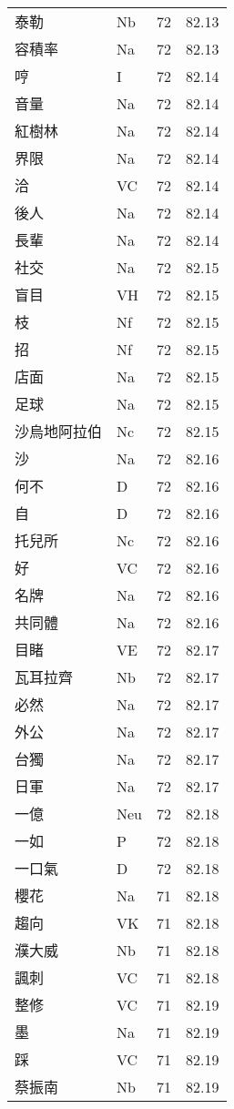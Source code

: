 \documentclass[twocolumn]{book}
\begin{document}
\begin{supertabular}{llrr}
泰勒 & Nb & 72 &  82.13\\
容積率 & Na & 72 &  82.13\\
哼 & I & 72 &  82.14\\
音量 & Na & 72 &  82.14\\
紅樹林 & Na & 72 &  82.14\\
界限 & Na & 72 &  82.14\\
洽 & VC & 72 &  82.14\\
後人 & Na & 72 &  82.14\\
長輩 & Na & 72 &  82.14\\
社交 & Na & 72 &  82.15\\
盲目 & VH & 72 &  82.15\\
枝 & Nf & 72 &  82.15\\
招 & Nf & 72 &  82.15\\
店面 & Na & 72 &  82.15\\
足球 & Na & 72 &  82.15\\
沙烏地阿拉伯 & Nc & 72 &  82.15\\
沙 & Na & 72 &  82.16\\
何不 & D & 72 &  82.16\\
自 & D & 72 &  82.16\\
托兒所 & Nc & 72 &  82.16\\
好 & VC & 72 &  82.16\\
名牌 & Na & 72 &  82.16\\
共同體 & Na & 72 &  82.16\\
目睹 & VE & 72 &  82.17\\
瓦耳拉齊 & Nb & 72 &  82.17\\
必然 & Na & 72 &  82.17\\
外公 & Na & 72 &  82.17\\
台獨 & Na & 72 &  82.17\\
日軍 & Na & 72 &  82.17\\
一億 & Neu & 72 &  82.18\\
一如 & P & 72 &  82.18\\
一口氣 & D & 72 &  82.18\\
櫻花 & Na & 71 &  82.18\\
趨向 & VK & 71 &  82.18\\
濮大威 & Nb & 71 &  82.18\\
諷刺 & VC & 71 &  82.18\\
整修 & VC & 71 &  82.19\\
墨 & Na & 71 &  82.19\\
踩 & VC & 71 &  82.19\\
蔡振南 & Nb & 71 &  82.19\\

\end{supertabular}
\end{document}
